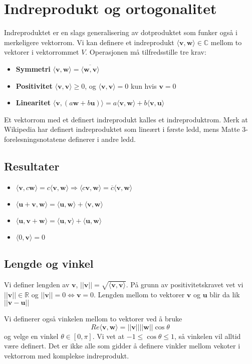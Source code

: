 \documentclass[12pt,a4paper,norsk]{article}
\newcommand{\R}{\mathbb{R}}
\newcommand{\C}{\mathbb{C}}
\newcommand{\inner}[1]{\langle#1\rangle}
\newcommand{\vv}{\textbf{v}}
\newcommand{\vw}{\textbf{w}}
\newcommand{\vu}{\textbf{u}}
\begin{document}
\section{Indreprodukt og ortogonalitet}\label{sec:indreprodukt}
Indreproduktet er en slags generalisering av dotproduktet som funker også i
merkeligere vektorrom. Vi kan definere et indreprodukt $\inner{\vv,\vw} \in \C$
mellom to vektorer i vektorrommet $V$. Operasjonen må tilfredsstille tre krav:
\begin{itemize}
\item \textbf{Symmetri} $\inner{\vv,\vw} = \overline{\inner{\vw,\vv}}$
\item \textbf{Positivitet} $\inner{\vv,\vv} \geq 0$, og $\inner{\vv,\vv} = 0$ kun
  hvis $\vv = 0$
\item \textbf{Linearitet} $\inner{\vv, (a\vw + b\vu)} = a\inner{\vv,\vw} + b\inner{\vv,\vu}$
\end{itemize}
Et vektorrom med et definert indreprodukt kalles et indreproduktrom. Merk at
Wikipedia har definert indreproduktet som lineært i første ledd, mens Matte
3-forelesningsnotatene definerer i andre ledd.

\subsection{Resultater}
\begin{itemize}
  \item $\inner{\vv,c \vw} = c\inner{\vv,\vw} \Longrightarrow \inner{c \vv,\vw} = \overline{c}\inner{\vv,\vw}$
  \item $\inner{\vu + \vv,\vw} = \inner{\vu,\vw} + \inner{\vv,\vw}$
  \item $\inner{\vu , \vv+\vw} = \inner{\vu,\vv} + \inner{\vu,\vw}$
  \item $\inner{0, \vv} = 0$

\end{itemize}

\subsection{Lengde og vinkel}
Vi definer lengden av $\vv$, $||\textbf{v}|| = \sqrt{\inner{\vv,\vv}}$. På
grunn av positivitetskravet vet vi $||\vv|| \in \R$ og $||\vv||=0 \iff \vv=0$.
Lengden mellom to vektorer $\vv$ og $\vu$ blir da lik $||\vv - \vu||$

Vi definerer også vinkelen mellom to vektorer ved å bruke
\[Re \inner{\vv,\vw} = ||\vv|| ||\vw|| \cos \theta\]
og velge en vinkel $\theta \in [0,\pi]$. Vi vet at
$-1 \leq \cos \theta \leq 1$, så vinkelen vil alltid være definert. Det er ikke
alle som gidder å definere vinkler mellom vekoter i vektorrom med komplekse
indreprodukt.
\end{document}
